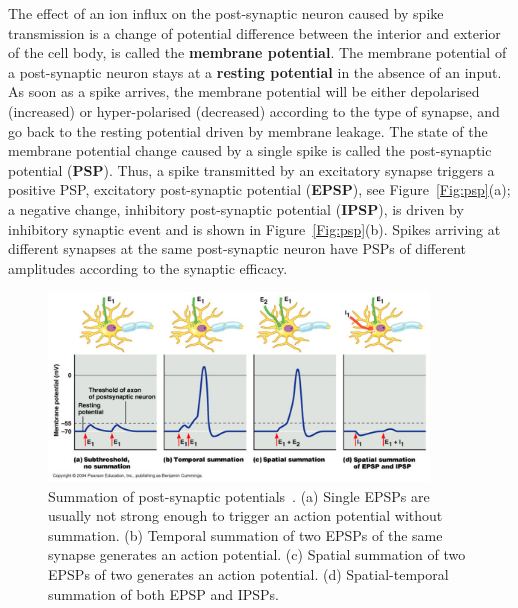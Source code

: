 The effect of an ion influx on the post-synaptic neuron caused by spike transmission is a change of potential difference between the interior and exterior of the cell body, \protect{} \protect{} is called the \textbf{membrane potential}.
The membrane potential of a post-synaptic neuron stays at a \textbf{resting potential} in the absence of an input.
As soon as a spike arrives, the membrane potential will be either depolarised (increased) or hyper-polarised (decreased) according to the type of synapse, and go back to the resting potential driven by \protect{} membrane leakage.
The state of the membrane potential change caused by a single spike is called the post-synaptic potential (\textbf{PSP}). 
Thus, a spike transmitted by an excitatory synapse triggers a positive \protect{} PSP, \protect{} \protect{} excitatory post-synaptic potential (\textbf{EPSP}), see Figure~\ref{Fig:psp}(a);
a negative change, \protect{} inhibitory post-synaptic potential (\textbf{IPSP}), is driven by \protect{} inhibitory synaptic event and is shown in Figure~\ref{Fig:psp}(b).
Spikes arriving at different synapses at the same post-synaptic neuron have PSPs of different amplitudes according to the synaptic efficacy.




\begin{figure}[bt!]
	\centering
	\includegraphics[width=0.9\textwidth]{pics_snn/psp.png}
	\caption{Summation of post-synaptic potentials~\citep{reece2011campbell}. 
		(a) Single EPSPs are usually not strong enough to trigger an action potential without summation. (b) Temporal summation of two EPSPs of the same synapse generates an action potential. (c) Spatial summation of two EPSPs of two \protect{} \protect{} generates an action potential. (d) Spatial-temporal summation of both EPSP and IPSPs.
	}
	\label{Fig:psp_sum}
\end{figure}

